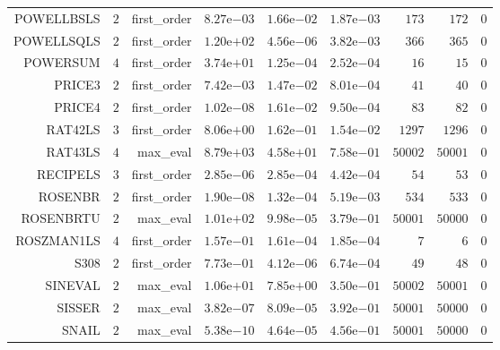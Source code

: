 \begin{longtable}{rrrrrrrrr}
POWELLBSLS & \(     2\) & first\_order & \( 8.27\)e\(-03\) & \( 1.66\)e\(-02\) & \( 1.87\)e\(-03\) & \(   173\) & \(   172\) & \(     0\) \\
POWELLSQLS & \(     2\) & first\_order & \( 1.20\)e\(+02\) & \( 4.56\)e\(-06\) & \( 3.82\)e\(-03\) & \(   366\) & \(   365\) & \(     0\) \\
POWERSUM & \(     4\) & first\_order & \( 3.74\)e\(+01\) & \( 1.25\)e\(-04\) & \( 2.52\)e\(-04\) & \(    16\) & \(    15\) & \(     0\) \\
PRICE3 & \(     2\) & first\_order & \( 7.42\)e\(-03\) & \( 1.47\)e\(-02\) & \( 8.01\)e\(-04\) & \(    41\) & \(    40\) & \(     0\) \\
PRICE4 & \(     2\) & first\_order & \( 1.02\)e\(-08\) & \( 1.61\)e\(-02\) & \( 9.50\)e\(-04\) & \(    83\) & \(    82\) & \(     0\) \\
RAT42LS & \(     3\) & first\_order & \( 8.06\)e\(+00\) & \( 1.62\)e\(-01\) & \( 1.54\)e\(-02\) & \(  1297\) & \(  1296\) & \(     0\) \\
RAT43LS & \(     4\) & max\_eval & \( 8.79\)e\(+03\) & \( 4.58\)e\(+01\) & \( 7.58\)e\(-01\) & \( 50002\) & \( 50001\) & \(     0\) \\
RECIPELS & \(     3\) & first\_order & \( 2.85\)e\(-06\) & \( 2.85\)e\(-04\) & \( 4.42\)e\(-04\) & \(    54\) & \(    53\) & \(     0\) \\
ROSENBR & \(     2\) & first\_order & \( 1.90\)e\(-08\) & \( 1.32\)e\(-04\) & \( 5.19\)e\(-03\) & \(   534\) & \(   533\) & \(     0\) \\
ROSENBRTU & \(     2\) & max\_eval & \( 1.01\)e\(+02\) & \( 9.98\)e\(-05\) & \( 3.79\)e\(-01\) & \( 50001\) & \( 50000\) & \(     0\) \\
ROSZMAN1LS & \(     4\) & first\_order & \( 1.57\)e\(-01\) & \( 1.61\)e\(-04\) & \( 1.85\)e\(-04\) & \(     7\) & \(     6\) & \(     0\) \\
S308 & \(     2\) & first\_order & \( 7.73\)e\(-01\) & \( 4.12\)e\(-06\) & \( 6.74\)e\(-04\) & \(    49\) & \(    48\) & \(     0\) \\
SINEVAL & \(     2\) & max\_eval & \( 1.06\)e\(+01\) & \( 7.85\)e\(+00\) & \( 3.50\)e\(-01\) & \( 50002\) & \( 50001\) & \(     0\) \\
SISSER & \(     2\) & max\_eval & \( 3.82\)e\(-07\) & \( 8.09\)e\(-05\) & \( 3.92\)e\(-01\) & \( 50001\) & \( 50000\) & \(     0\) \\
SNAIL & \(     2\) & max\_eval & \( 5.38\)e\(-10\) & \( 4.64\)e\(-05\) & \( 4.56\)e\(-01\) & \( 50001\) & \( 50000\) & \(     0\) \\

\end{longtable}
